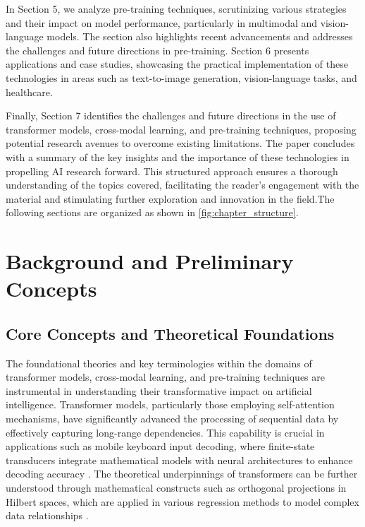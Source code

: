 In Section 5, we analyze pre-training techniques, scrutinizing various strategies and their impact on model performance, particularly in multimodal and vision-language models. The section also highlights recent advancements and addresses the challenges and future directions in pre-training. Section 6 presents applications and case studies, showcasing the practical implementation of these technologies in areas such as text-to-image generation, vision-language tasks, and healthcare.



Finally, Section 7 identifies the challenges and future directions in the use of transformer models, cross-modal learning, and pre-training techniques, proposing potential research avenues to overcome existing limitations. The paper concludes with a summary of the key insights and the importance of these technologies in propelling AI research forward. This structured approach ensures a thorough understanding of the topics covered, facilitating the reader's engagement with the material and stimulating further exploration and innovation in the field.The following sections are organized as shown in \autoref{fig:chapter_structure}.



\section{Background and Preliminary Concepts} \label{sec:Background and Preliminary Concepts}



\subsection{Core Concepts and Theoretical Foundations} \label{subsec:Core Concepts and Theoretical Foundations}

The foundational theories and key terminologies within the domains of transformer models, cross-modal learning, and pre-training techniques are instrumental in understanding their transformative impact on artificial intelligence. Transformer models, particularly those employing self-attention mechanisms, have significantly advanced the processing of sequential data by effectively capturing long-range dependencies. This capability is crucial in applications such as mobile keyboard input decoding, where finite-state transducers integrate mathematical models with neural architectures to enhance decoding accuracy \cite{vashishtha2019restoringchaosusingdeep}. The theoretical underpinnings of transformers can be further understood through mathematical constructs such as orthogonal projections in Hilbert spaces, which are applied in various regression methods to model complex data relationships \cite{kun2022mathematicalfoundationsregressionmethods}.



